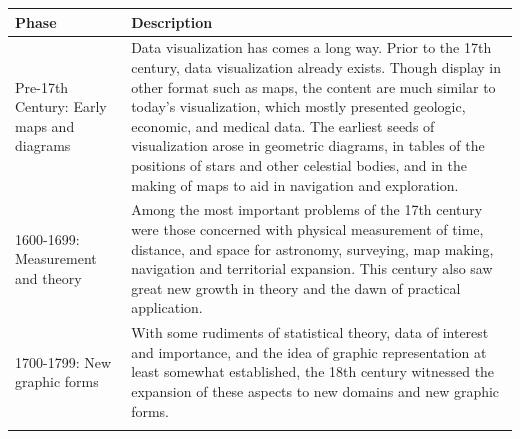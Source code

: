 \documentclass[]{book}
\theoremstyle{definition}
\theoremstyle{definition}
\theoremstyle{definition}
\theoremstyle{remark}
\begin{document}
\begin{longtable}[]{@{}ll@{}}
\toprule
\begin{minipage}[b]{0.16\columnwidth}\raggedright\strut
\textbf{Phase}\strut
\end{minipage} & \begin{minipage}[b]{0.78\columnwidth}\raggedright\strut
\textbf{Description}\strut
\end{minipage}\tabularnewline
\midrule
\endhead
\begin{minipage}[t]{0.16\columnwidth}\raggedright\strut
Pre-17th Century: Early maps and diagrams\strut
\end{minipage} & \begin{minipage}[t]{0.78\columnwidth}\raggedright\strut
Data visualization has comes a long way. Prior to the 17th century, data
visualization already exists. Though display in other format such as
maps, the content are much similar to today's visualization, which
mostly presented geologic, economic, and medical data. The earliest
seeds of visualization arose in geometric diagrams, in tables of the
positions of stars and other celestial bodies, and in the making of maps
to aid in navigation and exploration.\strut
\end{minipage}\tabularnewline
\begin{minipage}[t]{0.16\columnwidth}\raggedright\strut
1600-1699: Measurement and theory\strut
\end{minipage} & \begin{minipage}[t]{0.78\columnwidth}\raggedright\strut
Among the most important problems of the 17th century were those
concerned with physical measurement of time, distance, and space for
astronomy, surveying, map making, navigation and territorial expansion.
This century also saw great new growth in theory and the dawn of
practical application.\strut
\end{minipage}\tabularnewline
\begin{minipage}[t]{0.16\columnwidth}\raggedright\strut
1700-1799: New graphic forms\strut
\end{minipage} & \begin{minipage}[t]{0.78\columnwidth}\raggedright\strut
With some rudiments of statistical theory, data of interest and
importance, and the idea of graphic representation at least somewhat
established, the 18th century witnessed the expansion of these aspects
to new domains and new graphic forms.\strut
\end{minipage}\tabularnewline
\begin{minipage}[t]{0.16\columnwidth}\raggedright\strut

\end{minipage}
\end{longtable}
\end{document}
